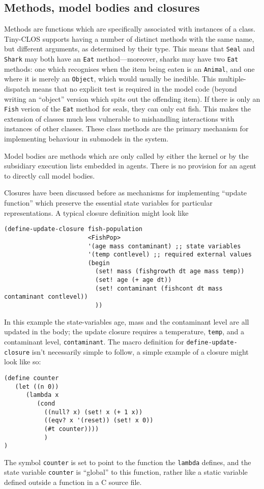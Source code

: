 \subsection{Methods, model bodies and closures}

Methods are functions which are specifically associated with instances
of a class.  Tiny-CLOS supports having a number of distinct methods
with the same name, but different arguments, as determined by their
type.  This means that \texttt{Seal} and \texttt{Shark} may both have an
\texttt{Eat} method---moreover, sharks may have two \texttt{Eat}
methods: one which recognises when the item being eaten is an
\texttt{Animal}, and one where it is merely an \texttt{Object}, which
would usually be inedible.  This multiple-dispatch means that no
explicit test is required in the model code (beyond writing an
``object'' version which spits out the offending item).  If there is
only an \texttt{Fish} verion of the \texttt{Eat} method for seals,
they can only eat fish.  This makes the extension of classes much less
vulnerable to mishandling interactions with instances of other
classes.  These class methods are the primary mechanism for
implementing behaviour in submodels in the system.

Model bodies are methods which are only called by either the kernel
or by the subsidiary execution lists embedded in agents. There is no
provision for an agent to directly call model bodies.

Closures have been discussed before as mechanisms for implementing
``update function'' which preserve the essential state variables for
particular representations.  A typical closure definition might look like 
\begin{verbatim}
(define-update-closure fish-population
                       <FishPop>
                       '(age mass contaminant) ;; state variables 
                       '(temp contlevel) ;; required external values
                       (begin
                         (set! mass (fishgrowth dt age mass temp))
                         (set! age (+ age dt))
                         (set! contaminant (fishcont dt mass contaminant contlevel))
                         ))
\end{verbatim}
In this example the state-variables age, mass and the contaminant
level are all updated in the body; the update closure requires a
temperature, \texttt{temp}, and a contaminant level, \texttt{contaminant}.
The macro definition for \texttt{define-update-closure} isn't
necessarily simple to follow, a simple example of a closure might look
like so:
\begin{verbatim}
(define counter 
   (let ((n 0))
      (lambda x 
         (cond
           ((null? x) (set! x (+ 1 x))
           ((eqv? x '(reset)) (set! x 0))
           (#t counter))))
           )
)
\end{verbatim}
The symbol \texttt{counter} is set to point to the function the
\texttt{lambda} defines, and the state variable \texttt{counter} is
``global'' to this function, rather like a static variable defined
outside a function in a C source file. 
             


